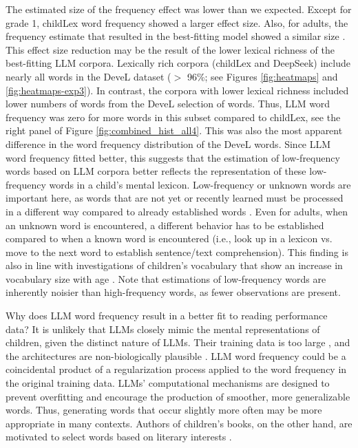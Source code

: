 \documentclass[manuscript]{stjour}
\begin{document}
The estimated size of the frequency effect was lower than we expected. Except for grade 1, childLex word frequency showed a larger effect size. Also, for adults, the frequency estimate that resulted in the best-fitting model showed a similar size \citep[see ][for effect size estimates with the DWDS word frequency]{schroter_developmental_2017}. This effect size reduction may be the result of the lower lexical richness of the best-fitting LLM corpora. Lexically rich corpora (childLex and DeepSeek) include nearly all words in the DeveL dataset ($>$ 96\%; see Figures \ref{fig:heatmaps} and \ref{fig:heatmaps-exp3}). In contrast, the corpora with lower lexical richness included lower numbers of words from the DeveL selection of words. Thus, LLM word frequency was zero for more words in this subset compared to childLex, see the right panel of Figure \ref{fig:combined_hist_all4}. This was also the most apparent difference in the word frequency distribution of the DeveL words. Since LLM word frequency fitted better, this suggests that the estimation of low-frequency words based on LLM corpora better reflects the representation of these low-frequency words in a child's mental lexicon. Low-frequency or unknown words are important here, as words that are not yet or recently learned must be processed in a different way compared to already established words \citep[e.g., see ][]{gagl_lexical_2022,gagl_investigating_2023}. Even for adults, when an unknown word is encountered, a different behavior has to be established compared to when a known word is encountered (i.e., look up in a lexicon vs. move to the next word to establish sentence/text comprehension). This finding is also in line with investigations of children's vocabulary that show an increase in vocabulary size with age \citep[e.g., ][]{segbers_how_2017, keuleers_word_2015}. Note that estimations of low-frequency words are inherently noisier than high-frequency words, as fewer observations are present. 

Why does LLM word frequency result in a better fit to reading performance data? It is unlikely that LLMs closely mimic the mental representations of children, given the distinct nature of LLMs. Their training data is too large \citep{frank_bridging_2023}, and the architectures are non-biologically plausible \citep{frank_bridging_2023}. LLM word frequency could be a coincidental product of a regularization process applied to the word frequency in the original training data. LLMs' computational mechanisms are designed to prevent overfitting and encourage the production of smoother, more generalizable words. Thus, generating words that occur slightly more often may be more appropriate in many contexts. Authors of children's books, on the other hand, are motivated to select words based on literary interests \citep{korochkina_morphology_2025}. 
\end{document}
